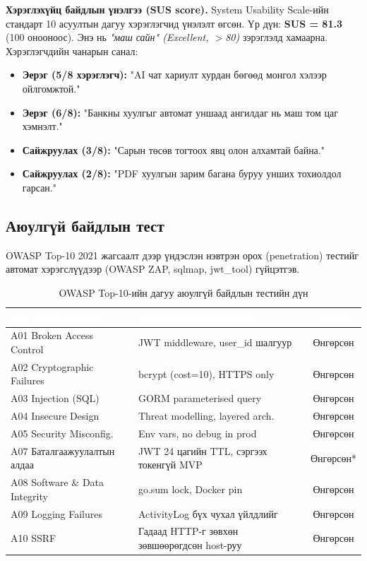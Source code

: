 \textbf{Хэрэглэхүйц байдлын үнэлгээ (SUS score).} System Usability Scale-ийн стандарт 10 асуултын дагуу хэрэглэгчид үнэлэлт өгсөн. Үр дүн: \textbf{SUS = 81.3} (100 онооноос). Энэ нь \emph{"маш сайн" (Excellent, $>$80)} зэрэглэлд хамаарна. Хэрэглэгчдийн чанарын санал:
\begin{itemize}
    \item \textbf{Эерэг (5/8 хэрэглэгч):} "AI чат хариулт хурдан бөгөөд монгол хэлээр ойлгомжтой."
    \item \textbf{Эерэг (6/8):} "Банкны хуулгыг автомат уншаад ангилдаг нь маш том цаг хэмнэлт."
    \item \textbf{Сайжруулах (3/8):} "Сарын төсөв тогтоох явц олон алхамтай байна."
    \item \textbf{Сайжруулах (2/8):} "PDF хуулгын зарим багана буруу унших тохиолдол гарсан."
\end{itemize}

\subsection{Аюулгүй байдлын тест}
OWASP Top-10 2021 жагсаалт дээр үндэслэн нэвтрэн орох (penetration) тестийг автомат хэрэгслүүдээр (OWASP ZAP, sqlmap, jwt\_tool) гүйцэтгэв.

\begin{table}[ht]
\centering
\footnotesize
\renewcommand{\arraystretch}{1.25}
\begin{tabular}{|p{4.3cm}|p{5.4cm}|c|}
\hline
\rowcolor{darknavy}
\textcolor{white}{\textbf{Сул талын ангилал}} &
\textcolor{white}{\textbf{Хамгаалалтын механизм}} &
\textcolor{white}{\textbf{Үр дүн}} \\ \hline
A01 Broken Access Control  & JWT middleware, user\_id шалгуур & Өнгөрсөн \\ \hline
A02 Cryptographic Failures & bcrypt (cost=10), HTTPS only      & Өнгөрсөн \\ \hline
A03 Injection (SQL)        & GORM parameterised query          & Өнгөрсөн \\ \hline
A04 Insecure Design        & Threat modelling, layered arch.   & Өнгөрсөн \\ \hline
A05 Security Misconfig.    & Env vars, no debug in prod        & Өнгөрсөн \\ \hline
A07 Баталгаажуулалтын алдаа & JWT 24 цагийн TTL, сэргээх токенгүй MVP & Өнгөрсөн* \\ \hline
A08 Software \& Data Integrity & go.sum lock, Docker pin       & Өнгөрсөн \\ \hline
A09 Logging Failures       & ActivityLog бүх чухал үйлдлийг      & Өнгөрсөн \\ \hline
A10 SSRF                   & Гадаад HTTP-г зөвхөн зөвшөөрөгдсөн host-руу & Өнгөрсөн \\ \hline
\end{tabular}
\caption{OWASP Top-10-ийн дагуу аюулгүй байдлын тестийн дүн}
\label{tab:security-test}
\end{table}

